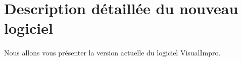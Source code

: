 \section{Description détaillée du nouveau logiciel}
\paragraph{}
Nous allons vous présenter la version actuelle du logiciel VisualImpro.
